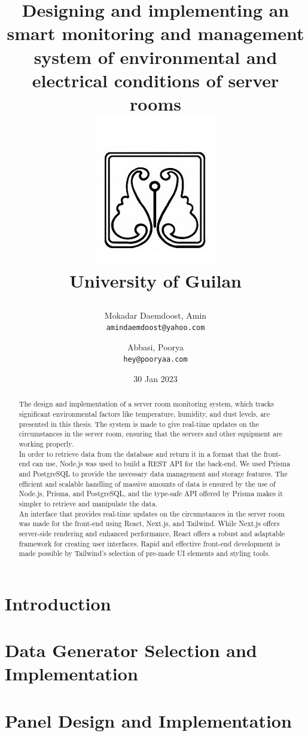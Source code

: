 \documentclass[12pt,twoside]{report}
\title{
{Designing and implementing an smart monitoring and management system of environmental and electrical conditions of server rooms
    }\\
    {\includegraphics{logo.jpg}}\\
    {\large University of Guilan}

}
\author{
  Mokadar Daemdoost, Amin\\
  \texttt{amindaemdoost@yahoo.com}
  \and
  Abbasi, Poorya\\
  \texttt{hey@pooryaa.com}
}
\date{30 Jan 2023}
\begin{document}
\fancyhead{}
\fancyfoot{}
\fancyfoot[LE,RO]{\thepage}
    \maketitle
    \begin{abstract}
      The design and implementation of a server room monitoring system, which tracks significant environmental factors like temperature, humidity, and dust levels, are presented in this thesis. The system is made to give real-time updates on the circumstances in the server room, ensuring that the servers and other equipment are working properly.\\
In order to retrieve data from the database and return it in a format that the front-end can use, Node.js was used to build a REST API for the back-end. We used Prisma and PostgreSQL to provide the necessary data management and storage features. The efficient and scalable handling of massive amounts of data is ensured by the use of Node.js, Prisma, and PostgreSQL, and the type-safe API offered by Prisma makes it simpler to retrieve and manipulate the data.
\\
An interface that provides real-time updates on the circumstances in the server room was made for the front-end using React, Next.js, and Tailwind. While Next.js offers server-side rendering and enhanced performance, React offers a robust and adaptable framework for creating user interfaces. Rapid and effective front-end development is made possible by Tailwind's selection of pre-made UI elements and styling tools.
    \end{abstract}
    \tableofcontents

    \chapter{Introduction}
    

    \chapter{Data Generator Selection and Implementation}
    

    \chapter{Panel Design and Implementation}
    





\end{document}
